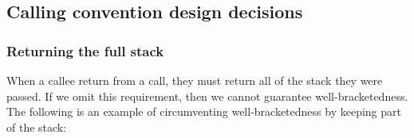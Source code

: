 \documentclass[a4paper]{article}
\begin{document}




\subsection{Calling convention design decisions}
\subsubsection{Returning the full stack}
When a callee return from a call, they must return all of the stack they were passed. If we omit this requirement, then we cannot guarantee well-bracketedness. The following is an example of circumventing well-bracketedness by keeping part of the stack:
\end{document}
